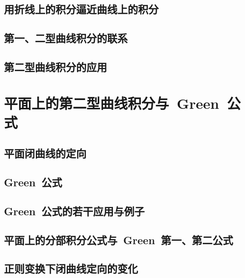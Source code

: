 \subsection{用折线上的积分逼近曲线上的积分}
\subsection{第一、二型曲线积分的联系}
\subsection{第二型曲线积分的应用}
\begin{exercise}
\item
\end{exercise}
\section{平面上的第二型曲线积分与~Green~公式}
\subsection{平面闭曲线的定向}
\subsection{Green~公式}
\subsection{Green~公式的若干应用与例子}
\subsection{平面上的分部积分公式与~Green~第一、第二公式}
\subsection{正则变换下闭曲线定向的变化}
\begin{exercise}
\item
\end{exercise}
\begin{exercise*}
\item
\end{exercise*}




\endinput
